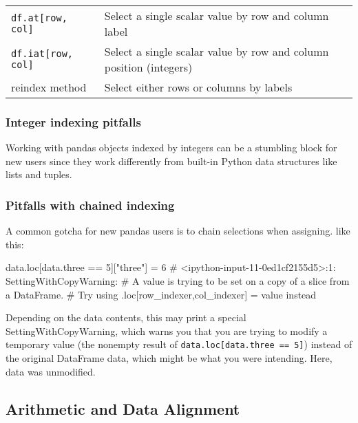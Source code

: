 \begin{table}
\begin{tabularx}{\textwidth}{lX}
        \verb|df.at[row, col]|     & Select a single scalar value by row and column label                                                                                                                                                  \\
        \verb|df.iat[row, col]|    & Select a single scalar value by row and column position (integers)                                                                                                                                    \\
        reindex method             & Select either rows or columns by labels                                                                                                                                                               \\
        \hline
    \end{tabularx}
\end{table}

\subsubsection{Integer indexing pitfalls}
Working with pandas objects indexed by integers can be a stumbling block for new users since they work differently from built-in Python data structures like lists and tuples.

\subsubsection*{Pitfalls with chained indexing}
A common gotcha for new pandas users is to chain selections when assigning. like
this:
\begin{pyc}
    data.loc[data.three == 5]["three"] = 6
    # <ipython-input-11-0ed1cf2155d5>:1: SettingWithCopyWarning:
    # A value is trying to be set on a copy of a slice from a DataFrame.
    # Try using .loc[row_indexer,col_indexer] = value instead
\end{pyc}
Depending on the data contents, this may print a special SettingWithCopyWarning,
which warns you that you are trying to modify a temporary value (the nonempty result of \verb|data.loc[data.three == 5]|) instead of the original DataFrame data, which might be what you were intending. Here, data was unmodified.

\subsection{Arithmetic and Data Alignment}
